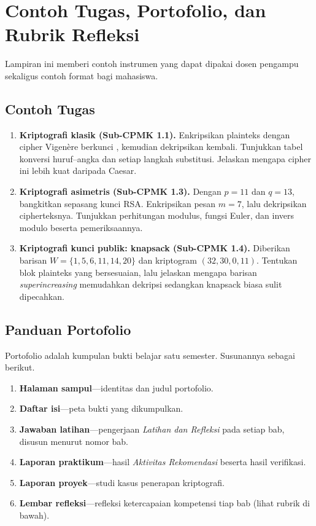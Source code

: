 \documentclass[../main.tex]{subfiles}
\begin{document}
\chapter{Contoh Tugas, Portofolio, dan Rubrik Refleksi}

Lampiran ini memberi contoh instrumen yang dapat dipakai dosen pengampu
sekaligus contoh format bagi mahasiswa.

\section{Contoh Tugas}

\begin{enumerate}[label=\textbf{Tugas \arabic*.}, leftmargin=*]
    \item \textbf{Kriptografi klasik (Sub-CPMK 1.1).} Enkripsikan plainteks
           dengan cipher Vigen\`ere berkunci ,
          kemudian dekripsikan kembali. Tunjukkan tabel konversi huruf--angka
          dan setiap langkah substitusi. Jelaskan mengapa cipher ini lebih kuat
          daripada Caesar.
    \item \textbf{Kriptografi asimetris (Sub-CPMK 1.3).} Dengan $p = 11$ dan
          $q = 13$, bangkitkan sepasang kunci RSA. Enkripsikan pesan
          $m = 7$, lalu dekripsikan cipherteksnya. Tunjukkan perhitungan
          modulus, fungsi Euler, dan invers modulo beserta pemeriksaannya.
    \item \textbf{Kriptografi kunci publik: knapsack (Sub-CPMK 1.4).}
          Diberikan barisan $W = \{1, 5, 6, 11, 14, 20\}$ dan kriptogram
          $(32, 30, 0, 11)$. Tentukan blok plainteks yang bersesuaian,
          lalu jelaskan mengapa barisan \textit{superincreasing} memudahkan
          dekripsi sedangkan knapsack biasa sulit dipecahkan.
\end{enumerate}

\section{Panduan Portofolio}

Portofolio adalah kumpulan bukti belajar satu semester. Susunannya sebagai
berikut.

\begin{enumerate}[label=\arabic*.]
    \item \textbf{Halaman sampul}---identitas dan judul portofolio.
    \item \textbf{Daftar isi}---peta bukti yang dikumpulkan.
    \item \textbf{Jawaban latihan}---pengerjaan \textit{Latihan dan Refleksi}
          pada setiap bab, disusun menurut nomor bab.
    \item \textbf{Laporan praktikum}---hasil \textit{Aktivitas Rekomendasi}
          beserta hasil verifikasi.
    \item \textbf{Laporan proyek}---studi kasus penerapan kriptografi.
    \item \textbf{Lembar refleksi}---refleksi ketercapaian kompetensi tiap bab
          (lihat rubrik di bawah).
\end{enumerate}
\end{document}
